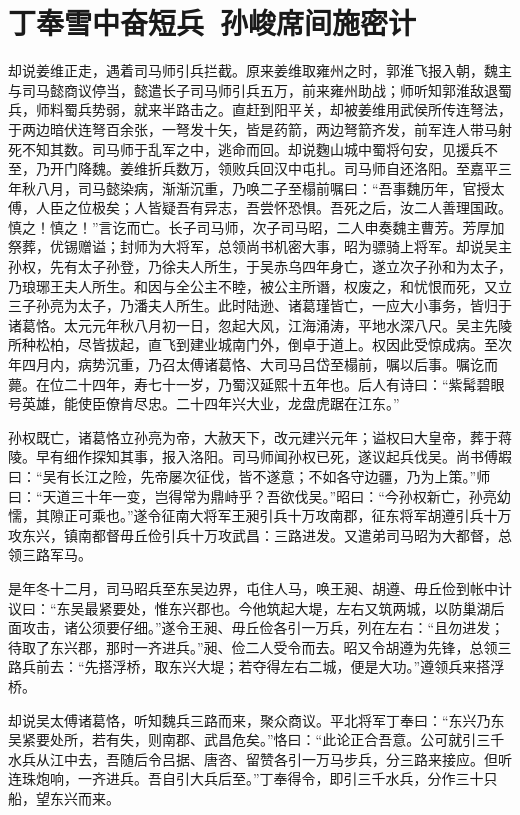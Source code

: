 \chapter{丁奉雪中奋短兵~孙峻席间施密计}

却说姜维正走，遇着司马师引兵拦截。原来姜维取雍州之时，郭淮飞报入朝，魏主与司马懿商议停当，懿遣长子司马师引兵五万，前来雍州助战；师听知郭淮敌退蜀兵，师料蜀兵势弱，就来半路击之。直赶到阳平关，却被姜维用武侯所传连弩法，于两边暗伏连弩百余张，一弩发十矢，皆是药箭，两边弩箭齐发，前军连人带马射死不知其数。司马师于乱军之中，逃命而回。却说麴山城中蜀将句安，见援兵不至，乃开门降魏。姜维折兵数万，领败兵回汉中屯扎。司马师自还洛阳。至嘉平三年秋八月，司马懿染病，渐渐沉重，乃唤二子至榻前嘱曰：“吾事魏历年，官授太傅，人臣之位极矣；人皆疑吾有异志，吾尝怀恐惧。吾死之后，汝二人善理国政。慎之！慎之！”言讫而亡。长子司马师，次子司马昭，二人申奏魏主曹芳。芳厚加祭葬，优锡赠谥；封师为大将军，总领尚书机密大事，昭为骠骑上将军。却说吴主孙权，先有太子孙登，乃徐夫人所生，于吴赤乌四年身亡，遂立次子孙和为太子，乃琅琊王夫人所生。和因与全公主不睦，被公主所谮，权废之，和忧恨而死，又立三子孙亮为太子，乃潘夫人所生。此时陆逊、诸葛瑾皆亡，一应大小事务，皆归于诸葛恪。太元元年秋八月初一日，忽起大风，江海涌涛，平地水深八尺。吴主先陵所种松柏，尽皆拔起，直飞到建业城南门外，倒卓于道上。权因此受惊成病。至次年四月内，病势沉重，乃召太傅诸葛恪、大司马吕岱至榻前，嘱以后事。嘱讫而薨。在位二十四年，寿七十一岁，乃蜀汉延熙十五年也。后人有诗曰：“紫髯碧眼号英雄，能使臣僚肯尽忠。二十四年兴大业，龙盘虎踞在江东。”

孙权既亡，诸葛恪立孙亮为帝，大赦天下，改元建兴元年；谥权曰大皇帝，葬于蒋陵。早有细作探知其事，报入洛阳。司马师闻孙权已死，遂议起兵伐吴。尚书傅嘏曰：“吴有长江之险，先帝屡次征伐，皆不遂意；不如各守边疆，乃为上策。”师曰：“天道三十年一变，岂得常为鼎峙乎？吾欲伐吴。”昭曰：“今孙权新亡，孙亮幼懦，其隙正可乘也。”遂令征南大将军王昶引兵十万攻南郡，征东将军胡遵引兵十万攻东兴，镇南都督毋丘俭引兵十万攻武昌：三路进发。又遣弟司马昭为大都督，总领三路军马。

是年冬十二月，司马昭兵至东吴边界，屯住人马，唤王昶、胡遵、毋丘俭到帐中计议曰：“东吴最紧要处，惟东兴郡也。今他筑起大堤，左右又筑两城，以防巢湖后面攻击，诸公须要仔细。”遂令王昶、毋丘俭各引一万兵，列在左右：“且勿进发；待取了东兴郡，那时一齐进兵。”昶、俭二人受令而去。昭又令胡遵为先锋，总领三路兵前去：“先搭浮桥，取东兴大堤；若夺得左右二城，便是大功。”遵领兵来搭浮桥。

却说吴太傅诸葛恪，听知魏兵三路而来，聚众商议。平北将军丁奉曰：“东兴乃东吴紧要处所，若有失，则南郡、武昌危矣。”恪曰：“此论正合吾意。公可就引三千水兵从江中去，吾随后令吕据、唐咨、留赞各引一万马步兵，分三路来接应。但听连珠炮响，一齐进兵。吾自引大兵后至。”丁奉得令，即引三千水兵，分作三十只船，望东兴而来。

